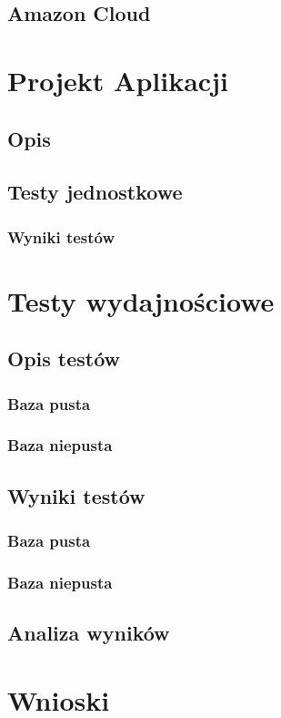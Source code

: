\documentclass[a4paper,12pt,twoside,openany]{report}
\begin{document}
\section{Amazon Cloud}

\chapter{Projekt Aplikacji}
\section{Opis}
\section{Testy jednostkowe}
\subsection{Wyniki testów}

\chapter{Testy wydajnościowe}
\section{Opis testów}
\subsection{Baza pusta}
\subsection{Baza niepusta}

\section{Wyniki testów}
\subsection{Baza pusta}
\subsection{Baza niepusta}
\section{Analiza wyników}

\chapter{Wnioski}
\end{document}
